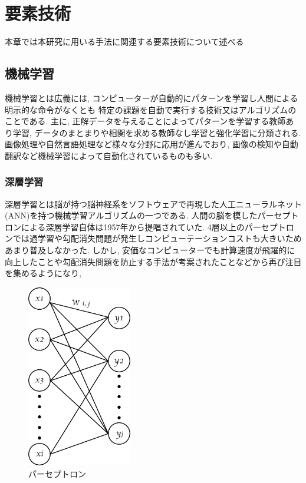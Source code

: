 \chapter{要素技術}
\label{technical_background}

本章では本研究に用いる手法に関連する要素技術について述べる


\section{機械学習}

機械学習とは広義には, コンピューターが自動的にパターンを学習し人間による明示的な命令がなくとも
特定の課題を自動で実行する技術又はアルゴリズムのことである. 主に, 正解データを与えることによってパターンを学習する教師あり学習, データのまとまりや相関を求める教師なし学習と強化学習に分類される.
画像処理や自然言語処理など様々な分野に応用が進んでおり, 画像の検知や自動翻訳など機械学習によって自動化されているものも多い.


\subsection{深層学習}

深層学習とは脳が持つ脳神経系をソフトウェアで再現した人工ニューラルネット(ANN)を持つ機械学習アルゴリズムの一つである. 
人間の脳を模したパーセプトロンによる深層学習自体は1957年から提唱されていた. 4層以上のパーセプトロンでは過学習や勾配消失問題が発生しコンピューテーションコストも大きいためあまり普及しなかった.
しかし, 安価なコンピューターでも計算速度が飛躍的に向上したことや勾配消失問題を防止する手法が考案されたことなどから再び注目を集めるようになり, 


\begin{figure}[H]
    \centering
    \includegraphics[clip,height = 8.0cm]{assets/perceptron.eps}
    \caption{パーセプトロン}  \label{sample}
\end{figure}

